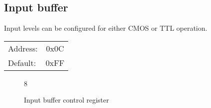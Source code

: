 \documentclass{article}
\begin{document}
	\subsection{Input buffer}

	Input levels can be configured for either CMOS or TTL operation.

	\begin{tabular}{ l c }
		Address: & 0x0C \\
		Default: & 0xFF \\
	\end{tabular}

	\begin{figure}[H]
		\centering
		\begin{bytefield}[
			bitwidth=0.1\linewidth]{8}
			 \\
		\end{bytefield}
		\caption{Input buffer control register}
		\label{reg:input_buffer}
	\end{figure}
\end{document}
